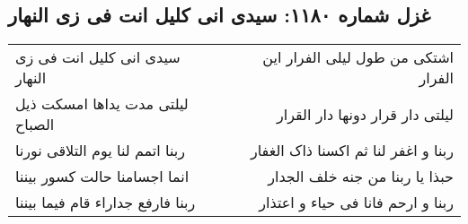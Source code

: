 \begin{center}
\section*{غزل شماره ۱۱۸۰: سیدی انی کلیل انت فی زی النهار}
\label{sec:1180}
\begin{longtable}{l p{0.5cm} r}
سیدی انی کلیل انت فی زی النهار
&&
اشتکی من طول لیلی الفرار این الفرار
\\
لیلتی مدت یداها امسکت ذیل الصباح
&&
لیلتی دار قرار دونها دار القرار
\\
ربنا اتمم لنا یوم التلاقی نورنا
&&
ربنا و اغفر لنا ثم اکسنا ذاک الغفار
\\
انما اجسامنا حالت کسور بیننا
&&
حبذا یا ربنا من جنه خلف الجدار
\\
ربنا فارفع جداراء قام فیما بیننا
&&
ربنا و ارحم فانا فی حیاء و اعتذار
\\
\end{longtable}
\end{center}
